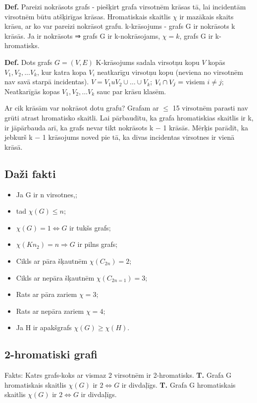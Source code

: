 \documentclass{article}
\begin{document}
\textbf{Def.}  Pareizi nokrāsots grafs - piešķirt grafa virsotnēm krāsas tā, lai incidentām virsotnēm būtu atšķirīgas krāsas.  Hromatiskais skaitlis $\chi $ ir mazākais skaits krāsu, ar ko var pareizi nokrāsot grafu.  k-krāsojums - grafs G ir nokrāsots k krāsās. Ja ir nokrāsots ⇒ grafs G ir k-nokrāsojams, $\chi = k$, grafs G ir k-hromatisks.

\textbf{Def.}  Dots grafs $G = (V , E )$ K-krāsojums sadala virsotņu kopu $V$ kopās $V_1  , V_2 , ...V_k$, kur katra kopa $V_i$ neatkarīgu virsotņu kopu (neviena no virsotnēm nav savā starpā incidentas).  $V = V_1 u V_2 \cup \ldots \cup V_k$; $V_i \cap V_j = \empty$ visiem $i \ne j$; Neatkarīgās kopas $V_1 , V_2 , \ldots V_k$ sauc par krāsu klasēm.

Ar cik krāsām var nokrāsot dotu grafu?  Grafam ar $\le$ 15 virsotnēm parasti nav grūti atrast hromatisko skaitli.  Lai pārbaudītu, ka grafa hromatiskias skaitlis ir k, ir jāpārbauda arī, ka grafs nevar tikt nokrāsots k − 1 krāsās.  Mērķis parādīt, ka jebkurš k − 1 krāsojums noved pie tā, ka divas incidentas virsotnes ir vienā krāsā.
 
\subsection{Daži fakti}
\begin{itemize}
	\item Ja G ir n virsotnes,;
	\item tad $\chi(G ) \le n$;
	\item $\chi(G ) = 1 \Leftrightarrow G$ ir tukšs grafs;
	\item $\chi(Kn_2 ) = n ⇒ G$ ir pilns grafs;
	\item Cikls ar pāra šķautnēm $\chi(C_{2n} ) = 2$;
	\item Cikls ar nepāra šķautnēm $\chi(C_{2n=1}) = 3$;
	\item Rats ar pāra zariem $\chi = 3$;
	\item Rats ar nepāra zariem $\chi = 4$;
	\item Ja H ir apakšgrafs $\chi(G ) \ge \chi(H)$.
\end{itemize} 

\subsection{2-hromatiski grafi}
Fakts: Katrs grafs-koks ar vismaz 2 virsotnēm ir 2-hromatisks.
\textbf{T. }Grafa G hromatiskais skaitlis $\chi(G )$ ir $2 ⇔ G$ ir divdaļīgs.
\textbf{T. }Grafa G hromatiskais skaitlis $\chi(G )$ ir $2 ⇔ G$ ir divdaļīgs.
 
\end{document}
